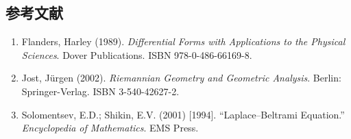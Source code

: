 \subsection{参考文献}
\begin{enumerate}
  \item Flanders, Harley (1989). \textit{Differential Forms with Applications to the Physical Sciences}. Dover Publications. ISBN 978-0-486-66169-8.
  \item Jost, Jürgen (2002). \textit{Riemannian Geometry and Geometric Analysis}. Berlin: Springer-Verlag. ISBN 3-540-42627-2.
  \item Solomentsev, E.D.; Shikin, E.V. (2001) [1994]. “Laplace–Beltrami Equation.” \textit{Encyclopedia of Mathematics}. EMS Press.
\end{enumerate}
